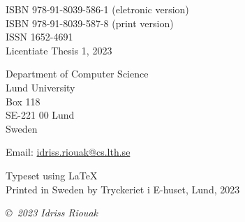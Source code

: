 \documentclass[a4paper, 10pt, twoside, openright]{book}
\begin{document}
\frontmatter

\begin{titlepage}

\thispagestyle{empty}


\begin{flushleft}


ISBN 978-91-8039-586-1 (eletronic version)\\
ISBN 978-91-8039-587-8 (print version)\\
ISSN 1652-4691\\
Licentiate Thesis 1, 2023\linebreak[2]

Department of Computer Science \\
Lund University \\
Box 118 \\
SE-221 00  Lund \\
Sweden  \linebreak[2]

Email: \url{idriss.riouak@cs.lth.se} \linebreak[2]

Typeset using \LaTeX \\

Printed in Sweden by Tryckeriet i E-huset, Lund, 2023\linebreak[2]

\textit{\copyright ~2023 Idriss Riouak}
\vspace{10mm}
\end{flushleft}
\end{titlepage}






\renewcommand{\thelstlisting}{\arabic{lstlisting}}



\setcounter{tocdepth}{3}
\tableofcontents

\mainmatter
\renewcommand{\thesection}{\arabic{section}}
\renewcommand{\thefigure}{\arabic{figure}}
\renewcommand{\thetable}{\arabic{table}}
\renewcommand{\thechapter}{\Roman{chapter}}
\renewcommand{\theequation}{\arabic{equation}}
\end{document}
